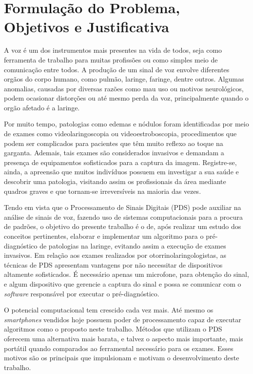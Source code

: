 \documentclass[a4paper,12pt,oneside]{report}
\begin{document}
\section{Formula\c{c}\~{a}o do Problema, Objetivos e Justificativa}
\label{sec:formulacao}
\hspace*{+15pt} A voz \'{e} um dos instrumentos mais presentes na vida de todos, seja como ferramenta de trabalho para muitas profiss\~{o}es ou como simples meio de comunica\c{c}\~{a}o entre todos. A produ\c{c}\~{a}o de um sinal de voz envolve diferentes org\~{a}os do corpo humano, como pulm\~{a}o, laringe, faringe, dentre outros. Algumas anomalias, causadas por diversas raz\~{o}es como mau uso ou motivos neurol\'{o}gicos, podem ocasionar distor\c{c}\~{o}es ou at\'{e} mesmo perda da voz, principalmente quando o org\~{a}o afetado \'{e} a laringe. 
\\
\par Por muito tempo, patologias como edemas e n\'{o}dulos foram identificadas por meio de exames como videolaringoscopia ou videoestroboscopia, procedimentos que podem ser complicados para pacientes que t\^{e}m muito reflexo ao toque na garganta. Ademais, tais exames s\~{a}o considerados invasivos  e demandam a presen\c{c}a de equipamentos sofisticados para a captura da imagem. Registre-se, ainda, a apreens\~{a}o que muitos indiv\'{i}duos possuem em investigar a sua sa\'{u}de e descobrir uma patologia, visitando assim os profissionais da \'{a}rea mediante quadros graves e que tornam-se irrevers\'{i}veis na maioria das vezes. 
\\
\par Tendo em vista que o Processamento de Sinais Digitais (PDS) pode auxiliar na an\'{a}lise de sinais de voz, fazendo uso de sistemas computacionais para a procura de padr\~{o}es, o objetivo do presente trabalho \'{e} o de, ap\'{o}s realizar um estudo dos conceitos pertinentes, elaborar e implementar um algoritmo para o pr\'{e}-diagn\'{o}stico de patologias na laringe, evitando assim a execu\c{c}\~{a}o de exames invasivos. Em rela\c{c}\~{a}o aos exames realizados por otorrinolaringologistas, as t\'{e}cnicas de PDS apresentam vantagens por n\~{a}o necessitar de dispositivos altamente sofisticados. \'{E} necess\'{a}rio apenas um microfone, para obten\c{c}\~{a}o do sinal, e algum dispositivo que gerencie a captura do sinal e possa se comunicar com o \textit{software} respons\'{a}vel por executar o pr\'{e}-diagn\'{o}stico. 
\\
\par O potencial computacional tem crescido cada vez mais. At\'{e} mesmo os \textit{smartphones} vendidos hoje possuem poder de processamento capaz de executar algoritmos como o proposto neste trabalho. M\'{e}todos que utilizam o PDS oferecem uma alternativa mais barata, e talvez o aspecto mais importante, mais port\'{a}til quando comparados ao ferramental necess\'{a}rio para os exames. Esses motivos s\~{a}o os principais que impulsionam e motivam o desenvolvimento deste trabalho.
\end{document}
